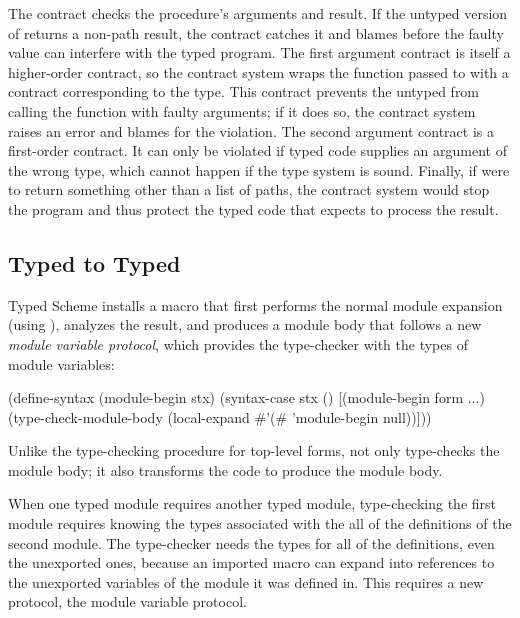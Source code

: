 \begin{schemeregion}
The  contract checks the procedure's arguments and
result. If the untyped version of  returns a
non-path result, the contract catches it and blames
 before the faulty value can interfere with the
typed program.
%
The first argument contract is itself a higher-order contract, so the
contract system wraps the function passed to  with
a contract corresponding to the  type. This
contract prevents the untyped  from calling the
function with faulty arguments; if it does so, the contract system
raises an error and blames  for the violation.
%
The second argument contract is a first-order contract. It can only be
violated if typed code supplies an argument of the wrong type, which
cannot happen if the type system is sound.
%
Finally, if  were to return something other than a
list of paths, the contract system would stop the program and thus
protect the typed code that expects to process the result.


\subsection{Typed to Typed}

Typed Scheme installs a  macro that first
performs the normal module expansion (using ),
analyzes the result, and produces a module body that follows a new
\emph{module variable protocol}, which provides the type-checker with
the types of module variables:
\begin{schemedisplay}
(define-syntax (module-begin stx)
  (syntax-case stx ()
    [(module-begin form ...)
     (type-check-module-body
      (local-expand #'(#%
                    'module-begin
                    null))]))
\end{schemedisplay}
Unlike the type-checking procedure for top-level forms,
 not only type-checks the module body;
it also transforms the code to produce the module body.

When one typed module requires another typed module, type-checking the
first module requires knowing the types associated with the all of the
definitions of the second module. The type-checker needs the types for
all of the definitions, even the unexported ones, because an imported
macro can expand into references to the unexported variables of the
module it was defined in.
%
This requires a new protocol, the module variable protocol.


\end{schemeregion}
